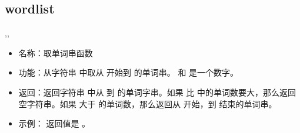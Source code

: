 \documentclass[a4paper,10pt]{sphinxmanual}
\begin{document}
\subsection{wordlist}
\label{\detokenize{functions:wordlist}}
\begin{sphinxVerbatim}[commandchars=\\\{\}]
 \PYGZlt{}\PYGZgt{},\PYGZlt{}\PYGZgt{},\PYGZlt{}\PYGZgt{}
\end{sphinxVerbatim}
\begin{itemize}
\item {} 
名称：取单词串函数

\item {} 
功能：从字符串  中取从  开始到  的单词串。 
和  是一个数字。

\item {} 
返回：返回字符串  中从  到  的单词字串。如果 
比  中的单词数要大，那么返回空字符串。如果  大于  的单词数，那么返回从  开始，到  结束的单词串。

\item {} 
示例：  返回值是  。

\end{itemize}
\end{document}
